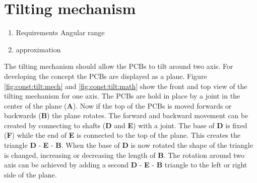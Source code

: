 \section{Tilting mechanism}

\begin{enumerate}
  \item Requirements
  \subitem Angular range
  \item approximation
\end{enumerate}


The tilting mechanism should allow the PCBs to tilt around two axis. For developing the concept the PCBs are displayed as a plane. Figure \ref{fig:const:tilt:mech} and \ref{fig:const:tilt:math} show the front and top view of the tilting mechanism for one axis.\p
%
The PCBs are hold in place by a joint in the center of the plane (\textbf{A}). Now if the top of the PCBs is moved forwards or backwards (\textbf{B}) the plane rotates. The forward and backward movement can be created by connecting to shafts (\textbf{D} and \textbf{E}) with a joint. The base of \textbf{D} is fixed (\textbf{F}) while the end of \textbf{E} is connected to the top of the plane. This creates the triangle \textbf{D} - \textbf{E} - \textbf{B}. When the base of \textbf{D} is now rotated the shape of the triangle is changed, increasing or decreasing the length of \textbf{B}.
The rotation around two axis can be achieved by adding a second \textbf{D} - \textbf{E} - \textbf{B} triangle to the left or right side of the plane.
%
